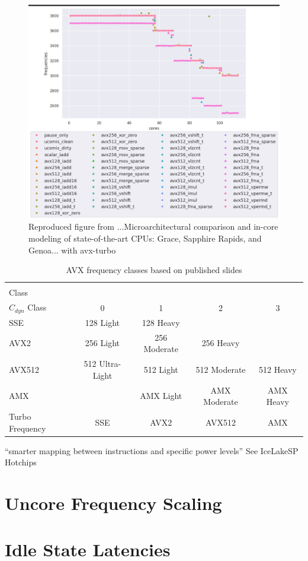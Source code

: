 \begin{figure}[]
    \centering
    \includegraphics[width=0.8\columnwidth]{fig/turbo-frequencies-per-core.png}
    \caption{Reproduced figure from ...Microarchitectural comparison and in-core modeling of state-of-the-art CPUs: Grace, Sapphire Rapids, and Genoa... with avx-turbo}
\end{figure}




\begin{table}[t]
	\centering
	\caption{\label{tab:cdyn-classes}AVX frequency classes based on published slides}
	\begin{tabular}{|l|c|c|c|c|}
        \hline
        \diagbox[height=5em]{Instruction\\Class}{\\$C_{dyn}$ Class} & 0 & 1 & 2 & 3 \\
        \hline
        SSE & 128 Light & 128 Heavy & & \\
        AVX2 & 256 Light & 256 Moderate & 256 Heavy & \\
        AVX512 & 512 Ultra-Light & 512 Light & 512 Moderate & 512 Heavy \\
        AMX & & AMX Light & AMX Moderate & AMX Heavy \\
        \hline \hline
        Turbo Frequency & SSE & AVX2 & AVX512 & AMX \\ 
        \hline
	\end{tabular}
\end{table}

``smarter mapping between instructions and specific power levels'' See IceLakeSP Hotchips


\section{Uncore Frequency Scaling}

\section{Idle State Latencies}
